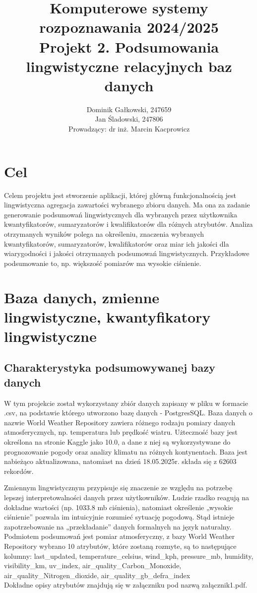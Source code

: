 \documentclass{article}
\author{
	{Dominik Gałkowski, 247659} \\
	{Jan Śladowski, 247806}\\ 
{Prowadzący: dr inż. Marcin Kacprowicz}
}
\title{Komputerowe systemy rozpoznawania 2024/2025\\Projekt 2. Podsumowania lingwistyczne relacyjnych baz danych}
\begin{document}
\maketitle 

\section{Cel}
Celem projektu jest stworzenie aplikacji, której główną funkcjonalnością
jest lingwistyczna agregacja zawartości wybranego zbioru danych. Ma ona za zadanie generowanie podsumowań lingwistycznych dla wybranych przez użytkownika kwantyfikatorów, sumaryzatorów i kwalifikatorów dla różnych atrybutów. Analiza otrzymanych wyników polega na określeniu, znaczenia wybranych kwantyfikatorów, sumaryzatorów, kwalifikatorów oraz miar ich jakości dla wiarygodności i jakości otrzymanych podsumowań lingwistycznych. Przykładowe podsumowanie to, np. większość pomiarów ma wysokie ciśnienie.


\section{Baza danych, zmienne lingwistyczne, kwantyfikatory lingwistyczne}

\subsection{Charakterystyka podsumowywanej bazy danych}
W tym projekcie został wykorzystany zbiór danych zapisany w pliku w formacie .csv, na podstawie którego utworzono bazę danych - PostgresSQL. Baza danych o nazwie World Weather Repository zawiera różnego rodzaju pomiary danych atmosferycznych, np. temperatura lub prędkość wiatru. \cite{baza} Użteczność bazy jest określona na stronie Kaggle jako 10.0, a dane z niej są wykorzystywane do prognozowanie pogody oraz analizy klimatu na różnych kontynentach. Baza jest nabieżąco aktualizowana, natomiast na dzień 18.05.2025r. składa się z 62603 rekordów. 

Zmiennym lingwistycznym przypisuje się znaczenie ze względu na potrzebę lepszej interpretowalności danych przez użytkowników. Ludzie rzadko reagują na dokładne wartości (np. 1033.8 mb ciśnienia), natomiast określenie „wysokie ciśnienie” pozwala im intuicyjnie rozumieć sytuację pogodową. Stąd istnieje zapotrzebowanie na „przekładanie” danych formalnych na język naturalny. \\
Podmiotem podsumowań jest pomiar atmosferyczny, z bazy World Weather Repository wybrano 10 atrybutów, które zostaną rozmyte, są to następujące kolumny: last\_updated, temperature\_celsius, wind\_kph, pressure\_mb, humidity, visibility\_km, uv\_index, air\_quality\_Carbon\_Monoxide,  \\air\_quality\_Nitrogen\_dioxide, air\_quality\_gb\_defra\_index \\
Dokładne opisy atrybutów znajdują się w załączniku pod nazwą załącznik1.pdf.
\end{document}
